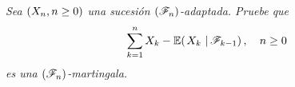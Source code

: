 \emph{
	Sea $\left( X_n,n\geq 0\right) $ una sucesi\'on $\left( \mathscr{F}_n\right) $-adaptada. Pruebe que
	\begin{align}
		\sum_{k=1}^n X_k-\espc{X_k}{\F_{k-1}}, \quad n\geq 0
	\end{align}
	es una $\left( \mathscr{F}_n\right) $-martingala.
}